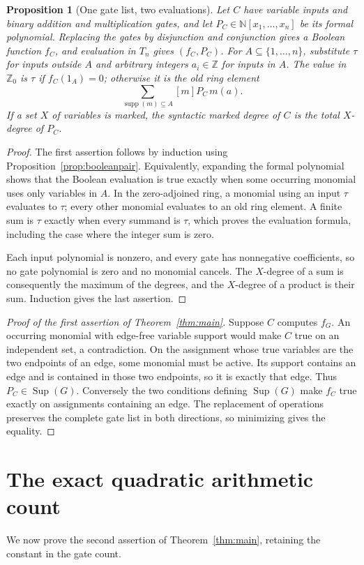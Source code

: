 \documentclass[11pt]{article}
\newcommand{\N}{\mathbb N}
\newcommand{\Z}{\mathbb Z}
\newcommand{\supp}{\operatorname{supp}}
\newcommand{\Sup}{\operatorname{Sup}}
\newtheorem{proposition}[theorem]{Proposition}
\theoremstyle{definition}
\theoremstyle{remark}
\begin{document}
\begin{proposition}[One gate list, two evaluations]\label{prop:lift}
Let $C$ have variable inputs and binary addition and multiplication gates, and let $P_C\in\N[x_1,\ldots,x_n]$ be its formal polynomial. Replacing the gates by disjunction and conjunction gives a Boolean function $f_C$, and evaluation in $T_n$ gives $(f_C,P_C)$. For $A\subseteq\{1,\ldots,n\}$, substitute $\tau$ for inputs outside $A$ and arbitrary integers $a_i\in\Z$ for inputs in $A$. The value in $\Z_0$ is $\tau$ if $f_C(1_A)=0$; otherwise it is the old ring element
\[
 \sum_{\supp(m)\subseteq A}[m]P_C\,m(a).
\]
If a set $X$ of variables is marked, the syntactic marked degree of $C$ is the total $X$-degree of $P_C$.
\end{proposition}
\begin{proof}
The first assertion follows by induction using Proposition~\ref{prop:booleanpair}. Equivalently, expanding the formal polynomial shows that the Boolean evaluation is true exactly when some occurring monomial uses only variables in $A$. In the zero-adjoined ring, a monomial using an input $\tau$ evaluates to $\tau$; every other monomial evaluates to an old ring element. A finite sum is $\tau$ exactly when every summand is $\tau$, which proves the evaluation formula, including the case where the integer sum is zero.

Each input polynomial is nonzero, and every gate has nonnegative coefficients, so no gate polynomial is zero and no monomial cancels. The $X$-degree of a sum is consequently the maximum of the degrees, and the $X$-degree of a product is their sum. Induction gives the last assertion.
\end{proof}

\begin{proof}[Proof of the first assertion of Theorem~\ref{thm:main}]
Suppose $C$ computes $f_G$. An occurring monomial with edge-free variable support would make $C$ true on an independent set, a contradiction. On the assignment whose true variables are the two endpoints of an edge, some monomial must be active. Its support contains an edge and is contained in those two endpoints, so it is exactly that edge. Thus $P_C\in\Sup(G)$. Conversely the two conditions defining $\Sup(G)$ make $f_C$ true exactly on assignments containing an edge. The replacement of operations preserves the complete gate list in both directions, so minimizing gives the equality.
\end{proof}

\section{The exact quadratic arithmetic count}
We now prove the second assertion of Theorem~\ref{thm:main}, retaining the constant in the gate count.
\end{document}
